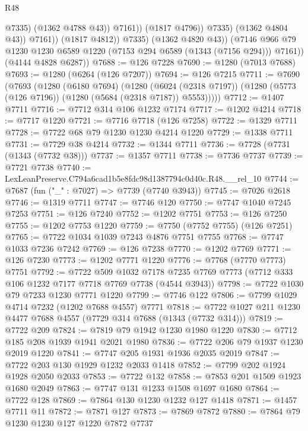\begin{lexlean}{R48}
\begin{coremodule}
                                @7335)
                              (@1362 @4788 @43))
                            @7161))
                        (@1817 @4796))
                      @7335)
                    (@1362 @4804 @43))
                  @7161))
              (@1817 @4812))
            @7335)
          (@1362 @4820 @43))
        (@7146 @966 @79 @1230 @1230 @6589 @1220 (@7153 @294 @6589 (@1343 (@7156 @294))) @7161))
      (@4144 @4828 @6287))
@7688 := @126 @7228
@7690 := @1280 (@7013 @7688)
@7693 := @1280 (@6264 (@126 @7207))
@7694 := @126 @7215
@7711 := @7690
    (@7693
      (@1280
        (@6180 @7694)
        (@1280
          (@6024 (@2318 @7197))
          (@1280 (@5773 (@126 @7196)) (@1280 (@5684 (@2318 @7187)) @5553)))))
@7712 := @1407 @7711
@7716 := @7712 @314 @106 @1232 @7174
@7717 := @1202 @4214
@7718 := @7717 @1220
@7721 := @7716 @7718 (@126 @7258)
@7722 := @1329 @7711
@7728 := @7722 @68 @79 @1230 @1230 @4214 @1220
@7729 := @1338 @7711
@7731 := @7729 @38 @4214
@7732 := @1344 @7711
@7736 := @7728 (@7731 (@1343 (@7732 @38)))
@7737 := @1357 @7711
@7738 := @7736 @7737
@7739 := @7721 @7738
@7740 := LexLeanPreserve.C794a6cad1b5e8fdc98d1387794c0d40c.R48.__rel_10
@7744 := @7687 (fun ("_" : @7027) => @7739 (@7740 @3943))
@7745 := @7026 @2618
@7746 := @1319 @7711
@7747 := @7746 @120
@7750 := @7747 @1040 @7245 @7253
@7751 := @126 @7240
@7752 := @1202 @7751
@7753 := @126 @7250
@7755 := @1202 @7753 @1220
@7759 := @7750 (@7752 @7755) (@126 @7251)
@7765 := @7722 @1034 @1039 @7243 @4876 @7751 @7755
@7768 := @7747 @1033 @7236 @7242
@7769 := @126 @7238
@7770 := @1202 @7769
@7771 := @126 @7230
@7773 := @1202 @7771 @1220
@7776 := @7768 (@7770 @7773) @7751
@7792 := @7722
    @509
    @1032
    @7178
    @7235
    @7769
    @7773
    (@7712 @333 @106 @1232 @7177 @7718 @7769 @7738 (@4544 @3943))
@7798 := @7722 @1030 @79 @7233 @1230 @7771 @1220
@7799 := @7746 @122
@7806 := @7799 @1029 @4714 @7232 (@1202 @7688 @4557) @7771
@7818 := @7722 @1027 @211 @1230 @4477 @7688 @4557 (@7729 @314 @7688 (@1343 (@7732 @314)))
@7819 := @7722 @209
@7824 := @7819 @79 @1942 @1230 @1980 @1220
@7830 := @7712 @185 @208 @1939 @1941 @2021 @1980
@7836 := @7722 @206 @79 @1937 @1230 @2019 @1220
@7841 := @7747 @205 @1931 @1936 @2035 @2019
@7847 := @7722 @203 @130 @1929 @1232 @2033 @1418
@7852 := @7799 @202 @1924 @1928 @2050 @2033
@7853 := @7722 @132
@7858 := @7853 @201 @1509 @1923 @1680 @2049
@7863 := @7747 @131 @1233 @1508 @1697 @1680
@7864 := @7722 @128
@7869 := @7864 @130 @1230 @1232 @127 @1418
@7871 := @1457 @7711 @11
@7872 := @7871 @127
@7873 := @7869 @7872
@7880 := @7864 @79 @1230 @1230 @127 @1220 @7872 @7737

\end{coremodule}
\end{lexlean}

